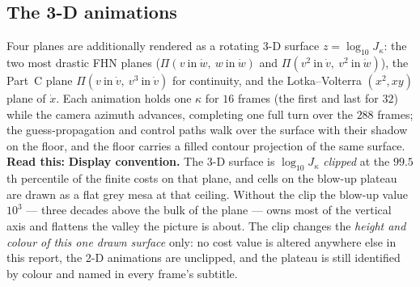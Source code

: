 \documentclass[10pt]{article}
\newcommand{\readthis}[1]{\textbf{Read this:} #1}
\begin{document}
\begin{table}[H]\centering\small
\caption{\textbf{The animated planes at production resolution} ($201\times201$; $\beta_\kappa$ and
$\varphi_\kappa$ as in \S\ref{sec:anim2defs}). One value is censored, and only one: the basin of
$\Pi(w\ \text{in}\ \dot v,\ v\ \text{in}\ \dot w)$ at $\kappa=100$ is a single cell,
$1/201^2=0.0025\,\%$, so the shrink factor printed for that row is a lower bound; every other basin in
the table is two cells or more and is measured. Column ``3-D'' marks the four planes that also have a
rotating 3-D animation; ``key'' is the file-name stem --- the 2-D video of a row is
\texttt{anim\_fhn\_landscape\_<key>\_hires.mp4} (\texttt{anim\_lv\_landscape\_x2\_xy\_hires.mp4} for the
Lotka--Volterra row) and its 3-D video, where it exists, is \texttt{anim3d\_fhn\_landscape\_<key>.mp4}
(\texttt{anim3d\_lv\_landscape\_x2\_xy.mp4}). $J^{\min}_\kappa$ is the
smallest cost anywhere on the plane at that $\kappa$; it is not in general attained at $p^\star$,
because the data carry $5\,\%$ noise. Data: \texttt{landscape\_hires\_geometry.csv}, written by
\texttt{figures/make\_landscape\_animations.py} from the same grids the frames are drawn from.}
\label{tab:T7}

\end{table}

\subsection{The 3-D animations}
Four planes are additionally rendered as a rotating 3-D surface $z=\log_{10}J_\kappa$: the two most
drastic FHN planes ($\Pi(v\ \text{in}\ \dot w,\ w\ \text{in}\ \dot w)$ and
$\Pi(v^2\ \text{in}\ \dot v,\ v^2\ \text{in}\ \dot w)$), the Part~C plane
$\Pi(v\ \text{in}\ \dot v,\ v^3\ \text{in}\ \dot v)$ for continuity, and the Lotka--Volterra $(x^2,xy)$ plane
of $\dot x$. Each animation holds one $\kappa$ for $16$ frames (the first and last for $32$) while the
camera azimuth advances, completing one full turn over the $288$ frames; the guess-propagation and
control paths walk over the surface with their shadow on the floor, and the floor carries a filled
contour projection of the same surface.
\readthis{\textbf{Display convention.} The 3-D surface is $\log_{10}J_\kappa$ \emph{clipped} at the
$99.5$th percentile of the finite costs on that plane, and cells on the blow-up plateau are drawn as a
flat grey mesa at that ceiling. Without the clip the blow-up value $10^3$ --- three decades above the
bulk of the plane --- owns most of the vertical axis and flattens the valley the picture is about. The
clip changes the \emph{height and colour of this one drawn surface} only: no cost value is altered
anywhere else in this report, the 2-D animations are unclipped, and the plateau is still identified by
colour and named in every frame's subtitle.}
\end{document}
